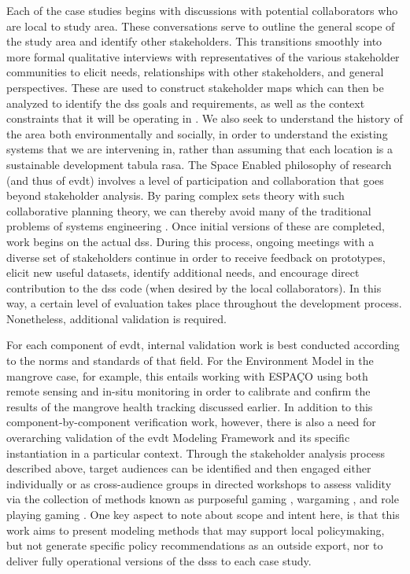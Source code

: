 \documentclass[notitlepage]{article}
\begin{document}
Each of the case studies begins with discussions with potential collaborators who are local to study area. These conversations serve to outline the general scope of the study area and identify other stakeholders. This transitions smoothly into more formal qualitative interviews with representatives of the various stakeholder communities to elicit needs, relationships with other stakeholders, and general perspectives. These are used to construct stakeholder maps which can then be analyzed to identify the \ac{dss} goals and requirements, as well as the context constraints that it will be operating in \cite{crawleySystemArchitectureStrategy2015, woodBuildingTechnologicalCapability2012}. We also seek to understand the history of the area both environmentally and socially, in order to understand the existing systems that we are intervening in, rather than assuming that each location is a sustainable development tabula rasa. The Space Enabled philosophy of research (and thus of \ac{evdt}) involves a level of participation and collaboration that goes beyond stakeholder analysis. By paring complex \ac{sets} theory with such collaborative planning theory, we can thereby avoid many of the traditional problems of systems engineering \cite{goodspeedScenarioPlanningCities2020}. Once initial versions of these are completed, work begins on the actual \ac{dss}. During this process, ongoing meetings with a diverse set of stakeholders continue in order to receive feedback on prototypes, elicit new useful datasets, identify additional needs, and encourage direct contribution to the \ac{dss} code (when desired by the local collaborators). In this way, a certain level of evaluation takes place throughout the development process. Nonetheless, additional validation is required.

For each component of \ac{evdt}, internal validation work is best conducted according to the norms and standards of that field. For the Environment Model in the mangrove case, for example, this entails working with ESPAÇO using both remote sensing and in-situ monitoring in order to calibrate and confirm the results of the mangrove health tracking discussed earlier. In addition to this component-by-component verification work, however, there is also a need for overarching validation of the \ac{evdt} Modeling Framework and its specific instantiation in a particular context. Through the stakeholder analysis process described above, target audiences can be identified and then engaged either individually or as cross-audience groups in directed workshops to assess validity via the collection of methods known as purposeful gaming \cite{rossGamebasedLearningSystems2014}, wargaming \cite{hansonImprovingOperationalWargaming2016,selvaRevitalizingWargamingNecessary15,shlapakReinforcingDeterrenceNATO2016}, and role playing gaming \cite{groganStrategicEngineeringGaming2012,groganFederatedSimulationGaming2012}. One key aspect to note about scope and intent here, is that this work aims to present modeling methods that may support local policymaking, but not generate specific policy recommendations as an outside export, nor to deliver fully operational versions of the \acp{dss} to each case study. 
\end{document}
